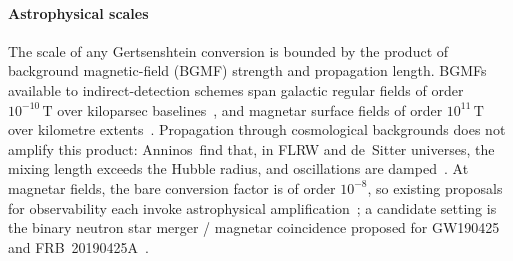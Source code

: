 \paragraph*{Astrophysical scales}
The scale of any Gertsenshtein conversion is bounded by
the product of background magnetic-field (BGMF) strength and
propagation length. BGMFs available to
indirect-detection schemes span galactic regular
fields of order $10^{-10}\,\mathrm{T}$ over kiloparsec
baselines~\cite{Domcke:2020yzq, Domcke:2022rgu, lella2024constraining},
and magnetar surface fields of order $10^{11}\,\mathrm{T}$ over
kilometre extents~\cite{Aggarwal:2020olq}.
Propagation through cosmological backgrounds does not amplify
this product: Anninos~\etal find that, in FLRW and
de~Sitter universes, the mixing length exceeds the Hubble radius,
and oscillations are damped~\cite{Anninos:2024esx}.
At magnetar fields, the bare conversion factor
is of order $10^{-8}$, so existing proposals for observability
each invoke astrophysical
amplification~\cite{kushwaha2022magnetar, mcdonald2024magnetar, Wu:2026nds};
a candidate setting is the binary neutron star merger /
magnetar coincidence proposed for GW190425 and
FRB~20190425A~\cite{Wu:2026nds}.


